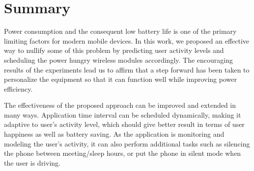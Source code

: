 \section{Summary}
Power consumption and the consequent low battery life is one of the primary limiting factors for modern mobile devices.
In this work, we proposed an effective way to nullify some of this problem by predicting user activity levels and scheduling
the power hungry wireless modules accordingly. The encouraging results of the experiments lead us to affirm that a step
forward has been taken to personalize the equipment so that it can function well while improving power efficiency.

The effectiveness of the proposed approach can be improved and extended in many ways. Application time interval
can be scheduled dynamically, making it adaptive to user's activity level, which should give better result in terms of user happiness
as well as battery saving. As the application is monitoring and modeling the user's activity, it can also perform additional tasks
such as silencing the phone between meeting/sleep hours, or put the phone in silent mode when the user is driving.
